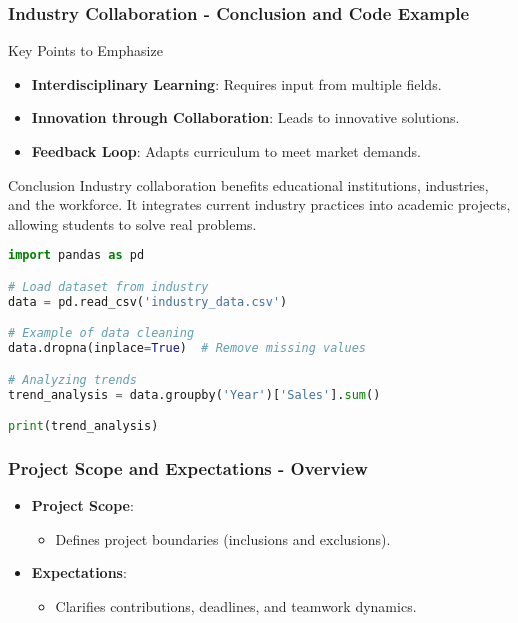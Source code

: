 \documentclass{beamer}
\begin{document}
\begin{frame}[fragile]
    \frametitle{Industry Collaboration - Conclusion and Code Example}
    \begin{block}{Key Points to Emphasize}
        \begin{itemize}
            \item \textbf{Interdisciplinary Learning}: Requires input from multiple fields.
            \item \textbf{Innovation through Collaboration}: Leads to innovative solutions.
            \item \textbf{Feedback Loop}: Adapts curriculum to meet market demands.
        \end{itemize}
    \end{block}
    
    \begin{block}{Conclusion}
        Industry collaboration benefits educational institutions, industries, and the workforce. It integrates current industry practices into academic projects, allowing students to solve real problems.
    \end{block}

    \begin{lstlisting}[language=Python]
import pandas as pd

# Load dataset from industry
data = pd.read_csv('industry_data.csv')

# Example of data cleaning
data.dropna(inplace=True)  # Remove missing values

# Analyzing trends
trend_analysis = data.groupby('Year')['Sales'].sum()

print(trend_analysis)
    \end{lstlisting}
\end{frame}

\begin{frame}[fragile]
    \frametitle{Project Scope and Expectations - Overview}
    \begin{itemize}
        \item \textbf{Project Scope}:
            \begin{itemize}
                \item Defines project boundaries (inclusions and exclusions).
            \end{itemize}
        \item \textbf{Expectations}:
            \begin{itemize}
                \item Clarifies contributions, deadlines, and teamwork dynamics.
            \end{itemize}
    \end{itemize}
\end{frame}
\end{document}
